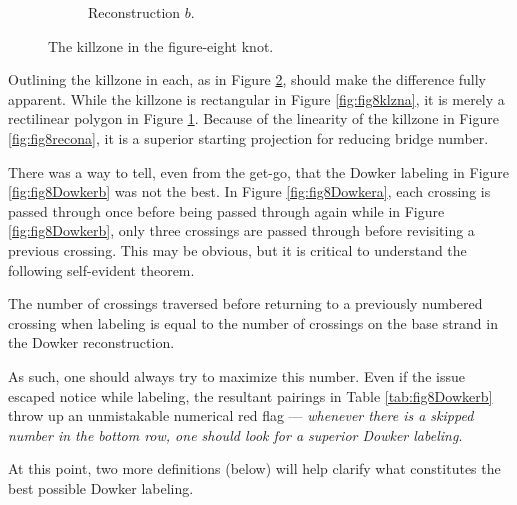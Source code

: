 \documentclass[titlepage,11pt]{article}
\begin{document}
\begin{figure}[h!]
\begin{subfigure}[b]{0.4\linewidth}
        \caption{Reconstruction $b$.}
        \label{fig:fig8klznb}
    \end{subfigure}
    \caption{The killzone in the figure-eight knot.}
    \label{fig:fig8klzn}
\end{figure}

Outlining the killzone in each, as in Figure \ref{fig:fig8klzn}, should make the difference fully apparent. While the killzone is rectangular in Figure \ref{fig:fig8klzna}, it is merely a rectilinear polygon in Figure \ref{fig:fig8klznb}. Because of the linearity of the killzone in Figure \ref{fig:fig8recona}, it is a superior starting projection for reducing bridge number.\par
There was a way to tell, even from the get-go, that the Dowker labeling in Figure \ref{fig:fig8Dowkerb} was not the best. In Figure \ref{fig:fig8Dowkera}, each crossing is passed through once before being passed through again while in Figure \ref{fig:fig8Dowkerb}, only three crossings are passed through before revisiting a previous crossing. This may be obvious, but it is critical to understand the following self-evident theorem.

\begin{theor}
    The number of crossings traversed before returning to a previously numbered crossing when labeling is equal to the number of crossings on the base strand in the Dowker reconstruction.
\end{theor}

As such, one should always try to maximize this number. Even if the issue escaped notice while labeling, the resultant pairings in Table \ref{tab:fig8Dowkerb} throw up an unmistakable numerical red flag --- \emph{whenever there is a skipped number in the bottom row, one should look for a superior Dowker labeling}.\par
At this point, two more definitions (below) will help clarify what constitutes the best possible Dowker labeling.
\end{document}
